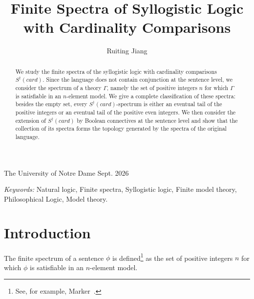 \documentclass[12pt, reqno]{amsart}
\theoremstyle{definition}
\theoremstyle{remark}
\numberwithin{equation}{section}
\begin{document}
\setcounter{page}{1}

\color{darkgray}
\noindent 
{\small The University of Notre Dame} \hfill {\small Sept. 2026}



\centerline{}

\centerline{}

\title{Finite Spectra of Syllogistic Logic with Cardinality Comparisons}

\author{Ruiting Jiang}

\address{
Department of Philosophy\\
University of Notre Dame\\
Notre Dame, IN, USA
}


\begin{abstract}
We study the finite spectra of the syllogistic logic with cardinality
comparisons $S^\dagger(card)$. Since the language does not contain
conjunction at the sentence level, we consider the spectrum of a theory
$\Gamma$, namely the set of positive integers $n$ for which $\Gamma$ is
satisfiable in an $n$-element model. We give a complete classification
of these spectra: besides the empty set, every $S^\dagger(card)$-spectrum
is either an eventual tail of the positive integers or an eventual tail
of the positive even integers. We then consider the extension of
$S^\dagger(card)$ by Boolean connectives at the sentence level and show
that the collection of its spectra forms the topology generated by the
spectra of the original language.
\end{abstract}

\maketitle 

\textit{Keywords:} Natural logic, Finite spectra, Syllogistic logic, Finite model theory, Philosophical Logic, Model theory.

\section{Introduction}

\noindent The finite spectrum of a sentence $\phi$ is defined\footnote{See, for example, Marker~\cite[p.~30]{Marker2002}.} as the set of positive integers $n$ for which $\phi$ is satisfiable in an $n$-element model. 
\end{document}
